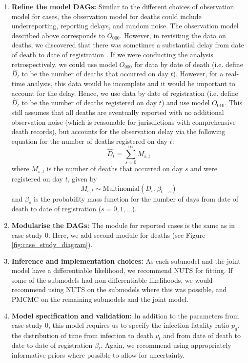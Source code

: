 \documentclass{article}
\begin{document}
\begin{enumerate}
\item \textbf{Refine the model DAGs:}       
    Similar to the different choices of observation model for cases, the observation model for deaths could include underreporting, reporting delays, and random noise. The observation model described above corresponds to $O_{000}$. However, in revisiting the data on deaths, we discovered that there was sometimes a substantial delay from date of death to date of registration \citep{seaman2022nowcasting}. If we were conducting the analysis retrospectively, we could use model $O_{000}$ for data by date of death (i.e. define $\hat{D}_t$ to be the number of deaths that occurred on day $t$). However, for a real-time analysis, this data would be incomplete and it would be important to account for the delay. Hence, we use data by date of registration (i.e. define $\hat{D}_t$ to be the number of deaths registered on day $t$) and use model $O_{010}$. This still assumes that all deaths are eventually reported with no additional observation noise (which is reasonable for jurisdictions with comprehensive death records), but accounts for the observation delay via the following equation for the number of deaths registered on day $t$:
\begin{equation}
    \hat{D}_t = \sum_{s=0}^\infty M_{s,t}
\end{equation}
where $M_{s,t}$ is the number of deaths that occurred on day $s$ and were registered on day $t$, given by
\begin{equation}
    M_{s,t} \sim \mathrm{Multinomial}\left( D_s, \beta_{t-s}\right) 
\end{equation}
and $\beta_s$ is the probability mass function for the number of days from date of death to date of registration ($s=0,1,\ldots$).

 \item \textbf{Modularise the DAGs:} The module for reported cases is the same as in case study 0. Here, we add second module for deaths (see Figure \ref{fig:case_study_diagram}).

\item \textbf{Inference and implementation choices:} As each submodel and the joint model have a differentiable likelihood, we recommend NUTS for fitting. If some of the submodels had non-differentiable likelihoods, we would recommend using NUTS on the submodels where this was possible, and PMCMC on the remaining submodels and the joint model.

\item \textbf{Model specification and validation:} In addition to the parameters from case study 0, this model requires us to specify the infection fatality ratio $p_d$, the distribution of time from infection to death $v_t$ and from date of death to date to date of registration $\beta_t$. Again, we recommend using appropriately informative priors where possible to allow for uncertainty. 



\end{enumerate}
\end{document}

